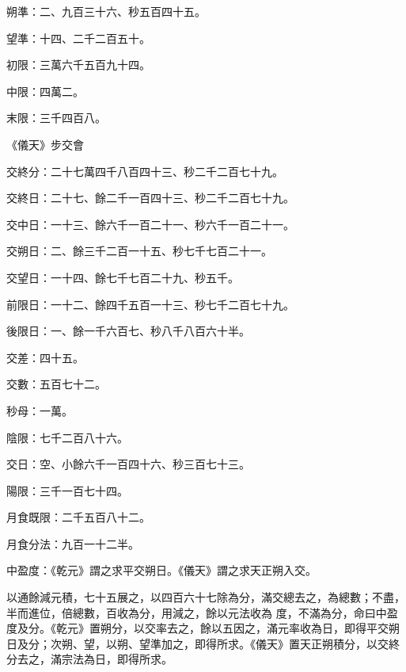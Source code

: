 \begin{pinyinscope}
 朔準：二、九百三十六、秒五百四十五。



 望準：十四、二千二百五十。



 初限：三萬六千五百九十四。



 中限：四萬二。



 末限：三千四百八。



 《儀天》步交會



 交終分：二十七萬四千八百四十三、秒二千二百七十九。



 交終日：二十七、餘二千一百四十三、秒二千二百七十九。



 交中日：一十三、餘六千一百二十一、秒六千一百二十一。



 交朔日：二、餘三千二百一十五、秒七千七百二十一。



 交望日：一十四、餘七千七百二十九、秒五千。



 前限日：一十二、餘四千五百一十三、秒七千二百七十九。



 後限日：一、餘一千六百七、秒八千八百六十半。



 交差：四十五。



 交數：五百七十二。



 秒母：一萬。



 陰限：七千二百八十六。



 交日：空、小餘六千一百四十六、秒三百七十三。



 陽限：三千一百七十四。



 月食既限：二千五百八十二。



 月食分法：九百一十二半。



 中盈度：《乾元》謂之求平交朔日。《儀天》謂之求天正朔入交。



 以通餘減元積，七十五展之，以四百六十七除為分，滿交總去之，為總數；不盡，半而進位，倍總數，百收為分，用減之，餘以元法收為
 度，不滿為分，命曰中盈度及分。《乾元》置朔分，以交率去之，餘以五因之，滿元率收為日，即得平交朔日及分；次朔、望，以朔、望準加之，即得所求。《儀天》置天正朔積分，以交終分去之，滿宗法為日，即得所求。




\end{pinyinscope}
